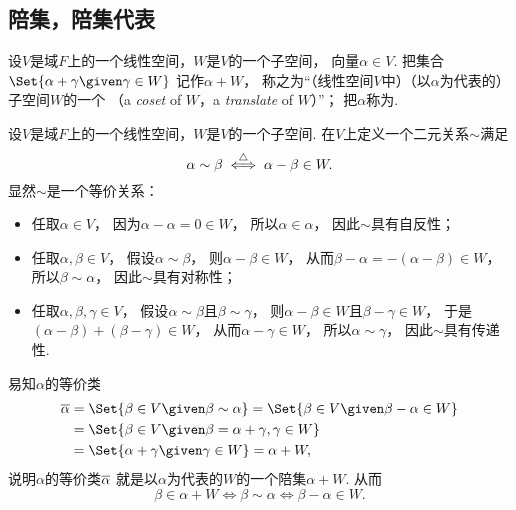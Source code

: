 \subsection{陪集，陪集代表}
\begin{definition}
设\(V\)是域\(F\)上的一个线性空间，\(W\)是\(V\)的一个子空间，
向量\(\alpha \in V\).
把集合\(\Set{ \alpha + \gamma \given \gamma \in W }\)
记作\(\alpha+W\)，
称之为“（线性空间\(V\)中）（以\(\alpha\)为代表的）子空间\(W\)的一个%
（a \emph{coset} of \(W\)，a \emph{translate} of \(W\)）”；
把\(\alpha\)称为.
\end{definition}

设\(V\)是域\(F\)上的一个线性空间，\(W\)是\(V\)的一个子空间.
在\(V\)上定义一个二元关系\(\sim\)满足\begin{equation*}
	\alpha\sim\beta
	\overset{\triangle}{\iff}
	\alpha-\beta\in W.
\end{equation*}
显然\(\sim\)是一个等价关系：\begin{itemize}
	\item 任取\(\alpha \in V\)，
	因为\(\alpha - \alpha = 0 \in W\)，
	所以\(\alpha \in \alpha\)，
	因此\(\sim\)具有自反性；
	\item 任取\(\alpha,\beta \in V\)，
	假设\(\alpha \sim \beta\)，
	则\(\alpha - \beta \in W\)，
	从而\(\beta - \alpha = - (\alpha - \beta) \in W\)，
	所以\(\beta \sim \alpha\)，
	因此\(\sim\)具有对称性；
	\item 任取\(\alpha,\beta,\gamma \in V\)，
	假设\(\alpha \sim \beta\)且\(\beta \sim \gamma\)，
	则\(\alpha - \beta \in W\)且\(\beta - \gamma \in W\)，
	于是\(
		(\alpha - \beta)	\allowbreak
		+					\allowbreak
		(\beta - \gamma)	\allowbreak
		\in W
	\)，
	从而\(\alpha - \gamma \in W\)，
	所以\(\alpha \sim \gamma\)，
	因此\(\sim\)具有传递性.
\end{itemize}
易知\(\alpha\)的等价类\begin{align*}
	\EquivalenceClassO{\alpha}
	&= \Set{ \beta \in V \given \beta \sim \alpha }
	= \Set{ \beta \in V \given \beta - \alpha \in W } \\
	&= \Set{ \beta \in V \given \beta = \alpha + \gamma, \gamma \in W } \\
	&= \Set{ \alpha+\gamma \given \gamma \in W }
	= \alpha+W,
\end{align*}
说明\(\alpha\)的等价类\(\EquivalenceClassO{\alpha}\)
就是以\(\alpha\)为代表的\(W\)的一个陪集\(\alpha+W\).
从而\begin{equation*}
	\beta \in \alpha + W
	\iff
	\beta \sim \alpha
	\iff
	\beta - \alpha \in W.
\end{equation*}

